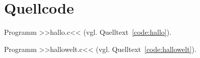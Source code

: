 \section{Quellcode}\label{quellcode} 

Programm >>hallo.c<< (vgl. Quelltext~\ref{code:hallo}).%
  

Programm >>hallowelt.c<< (vgl. Quelltext~\ref{code:hallowelt}).%
  


